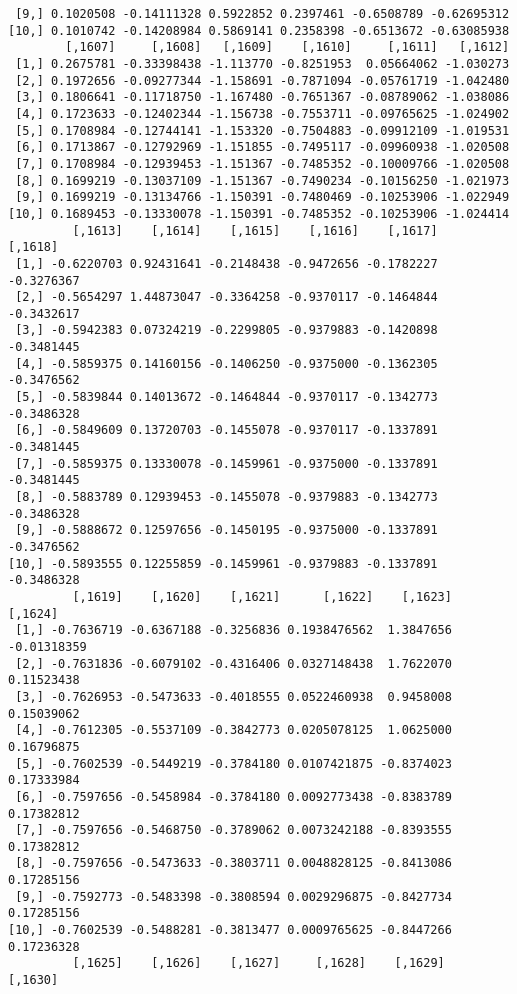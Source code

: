 \documentclass[
  letterpaper,
  DIV=11,
  numbers=noendperiod]{scrreprt}
\begin{document}
\begin{verbatim}
 [9,] 0.1020508 -0.14111328 0.5922852 0.2397461 -0.6508789 -0.62695312
[10,] 0.1010742 -0.14208984 0.5869141 0.2358398 -0.6513672 -0.63085938
        [,1607]     [,1608]   [,1609]    [,1610]     [,1611]   [,1612]
 [1,] 0.2675781 -0.33398438 -1.113770 -0.8251953  0.05664062 -1.030273
 [2,] 0.1972656 -0.09277344 -1.158691 -0.7871094 -0.05761719 -1.042480
 [3,] 0.1806641 -0.11718750 -1.167480 -0.7651367 -0.08789062 -1.038086
 [4,] 0.1723633 -0.12402344 -1.156738 -0.7553711 -0.09765625 -1.024902
 [5,] 0.1708984 -0.12744141 -1.153320 -0.7504883 -0.09912109 -1.019531
 [6,] 0.1713867 -0.12792969 -1.151855 -0.7495117 -0.09960938 -1.020508
 [7,] 0.1708984 -0.12939453 -1.151367 -0.7485352 -0.10009766 -1.020508
 [8,] 0.1699219 -0.13037109 -1.151367 -0.7490234 -0.10156250 -1.021973
 [9,] 0.1699219 -0.13134766 -1.150391 -0.7480469 -0.10253906 -1.022949
[10,] 0.1689453 -0.13330078 -1.150391 -0.7485352 -0.10253906 -1.024414
         [,1613]    [,1614]    [,1615]    [,1616]    [,1617]    [,1618]
 [1,] -0.6220703 0.92431641 -0.2148438 -0.9472656 -0.1782227 -0.3276367
 [2,] -0.5654297 1.44873047 -0.3364258 -0.9370117 -0.1464844 -0.3432617
 [3,] -0.5942383 0.07324219 -0.2299805 -0.9379883 -0.1420898 -0.3481445
 [4,] -0.5859375 0.14160156 -0.1406250 -0.9375000 -0.1362305 -0.3476562
 [5,] -0.5839844 0.14013672 -0.1464844 -0.9370117 -0.1342773 -0.3486328
 [6,] -0.5849609 0.13720703 -0.1455078 -0.9370117 -0.1337891 -0.3481445
 [7,] -0.5859375 0.13330078 -0.1459961 -0.9375000 -0.1337891 -0.3481445
 [8,] -0.5883789 0.12939453 -0.1455078 -0.9379883 -0.1342773 -0.3486328
 [9,] -0.5888672 0.12597656 -0.1450195 -0.9375000 -0.1337891 -0.3476562
[10,] -0.5893555 0.12255859 -0.1459961 -0.9379883 -0.1337891 -0.3486328
         [,1619]    [,1620]    [,1621]      [,1622]    [,1623]     [,1624]
 [1,] -0.7636719 -0.6367188 -0.3256836 0.1938476562  1.3847656 -0.01318359
 [2,] -0.7631836 -0.6079102 -0.4316406 0.0327148438  1.7622070  0.11523438
 [3,] -0.7626953 -0.5473633 -0.4018555 0.0522460938  0.9458008  0.15039062
 [4,] -0.7612305 -0.5537109 -0.3842773 0.0205078125  1.0625000  0.16796875
 [5,] -0.7602539 -0.5449219 -0.3784180 0.0107421875 -0.8374023  0.17333984
 [6,] -0.7597656 -0.5458984 -0.3784180 0.0092773438 -0.8383789  0.17382812
 [7,] -0.7597656 -0.5468750 -0.3789062 0.0073242188 -0.8393555  0.17382812
 [8,] -0.7597656 -0.5473633 -0.3803711 0.0048828125 -0.8413086  0.17285156
 [9,] -0.7592773 -0.5483398 -0.3808594 0.0029296875 -0.8427734  0.17285156
[10,] -0.7602539 -0.5488281 -0.3813477 0.0009765625 -0.8447266  0.17236328
         [,1625]    [,1626]    [,1627]     [,1628]    [,1629]    [,1630]

\end{verbatim}
\end{document}
